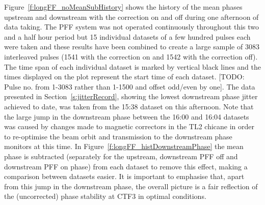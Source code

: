 Figure~\ref{f:longFF_noMeanSubHistory} shows the history of the mean phases upstream and downstream with the correction on and off during one afternoon of data taking. The PFF system was not operated continuously throughout this two and a half hour period but 15 individual datasets of a few hundred pulses each were taken and these results have been combined to create a large sample of 3083 interleaved pulses (1541 with the correction on and 1542 with the correction off). The time span of each individual dataset is marked by vertical black lines and the times displayed on the plot represent the start time of each dataset. [TODO: Pulse no. from 1-3083 rather than 1-1500 and offset odd/even by one]. The data presented in Section~\ref{s:jitterRecord}, showing the lowest downstream phase jitter achieved to date, was taken from the 15:38 dataset on this afternoon. Note that the large jump in the downstream phase between the 16:00 and 16:04 datasets was caused by changes made to magnetic correctors in the TL2 chicane in order to re-optimise the beam orbit and transmission to the downstream phase monitors at this time. In Figure~\ref{f:longFF_histDownstreamPhase} the mean phase is subtracted (separately for the upstream, downstream PFF off and downstream PFF on phase) from each dataset to remove this effect, making a comparison between datasets easier. It is important to emphasise that, apart from this jump in the downstream phase, the overall picture is a fair reflection of the (uncorrected) phase stability at CTF3 in optimal conditions.

